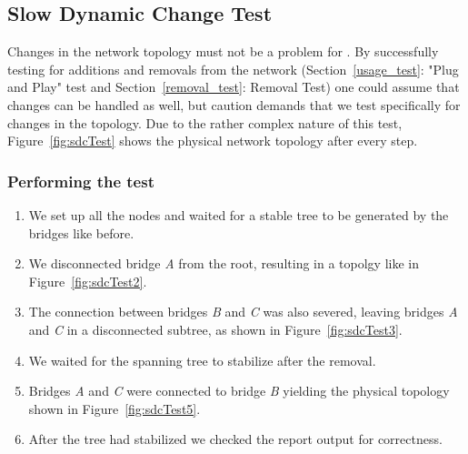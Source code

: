 \subsection*{Slow Dynamic Change Test}
\label{slow_dynamic_test}
Changes in the network topology must not be a problem for \tool.
By successfully testing for additions and removals from the network (Section~\ref{usage_test}: "Plug and Play" test and Section~\ref{removal_test}: Removal Test) one could assume that changes can be handled as well, but caution demands that we test specifically for changes in the topology.
Due to the rather complex nature of this test, Figure~\ref{fig:sdcTest} shows the physical network topology after every step.

\subsubsection*{Performing the test}
\begin{enumerate}
    \item We set up all the nodes and waited for a stable tree to be generated by the bridges like before.
    \item We disconnected bridge \textit{A} from the root, resulting in a topolgy like in Figure~\ref{fig:sdcTest2}.
    \item The connection between bridges \textit{B} and \textit{C} was also severed, leaving bridges \textit{A} and \textit{C} in a disconnected subtree, as shown in Figure~\ref{fig:sdcTest3}.
    \item We waited for the spanning tree to stabilize after the removal.
    \item Bridges \textit{A} and \textit{C} were connected to bridge \textit{B} yielding the physical topology shown in Figure~\ref{fig:sdcTest5}.
    \item After the tree had stabilized we checked the report output for correctness.
\end{enumerate}

